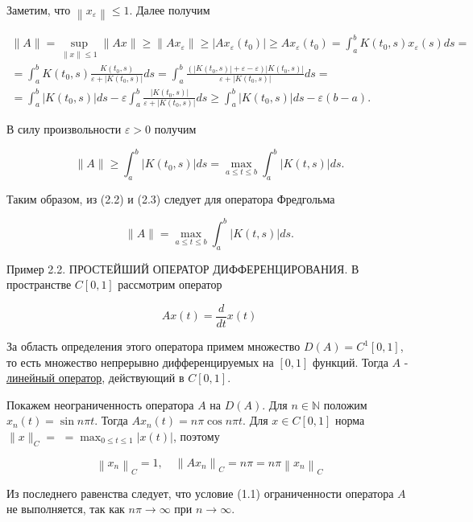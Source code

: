 \documentclass[a4paper, 12pt]{extarticle}
\begin{document}
Заметим, что $\left\|x_{\varepsilon}\right\| \leq 1$. Далее получим

$$
	\begin{gathered}
		\|A\|=\sup _{\|x\| \leq 1}\|A x\| \geq\left\|A x_{\varepsilon}\right\| \geq\left|A x_{\varepsilon}\left(t_{0}\right)\right| \geq A x_{\varepsilon}\left(t_{0}\right)=\int_{a}^{b} K\left(t_{0}, s\right) x_{\varepsilon}(s) d s= \\
		=\int_{a}^{b} K\left(t_{0}, s\right) \frac{K\left(t_{0}, s\right)}{\varepsilon+\left|K\left(t_{0}, s\right)\right|} d s=\int_{a}^{b} \frac{\left(\left|K\left(t_{0}, s\right)\right|+\varepsilon-\varepsilon\right)\left|K\left(t_{0}, s\right)\right|}{\varepsilon+\left|K\left(t_{0}, s\right)\right|} d s= \\
		=\int_{a}^{b}\left|K\left(t_{0}, s\right)\right| d s-\varepsilon \int_{a}^{b} \frac{\left|K\left(t_{0}, s\right)\right|}{\varepsilon+\left|K\left(t_{0}, s\right)\right|} d s \geq \int_{a}^{b}\left|K\left(t_{0}, s\right)\right| d s-\varepsilon(b-a) .
	\end{gathered}
$$

В силу произвольности $\varepsilon>0$ получим

$$
	\|A\| \geq \int_{a}^{b}\left|K\left(t_{0}, s\right)\right| d s=\max _{a \leq t \leq b} \int_{a}^{b}|K(t, s)| d s .
$$

Таким образом, из (2.2) и (2.3) следует для оператора Фредгольма

$$
	\|A\|=\max _{a \leq t \leq b} \int_{a}^{b}|K(t, s)| d s .
$$

Пример 2.2. ПРОСТЕЙШИЙ ОПЕРАТОР ДИФФЕРЕНЦИРОВАНИЯ. В пространстве $C[0,1]$ рассмотрим оператор

$$
	A x(t)=\frac{d}{d t} x(t)
$$

За область определения этого оператора примем множество $D(A)=C^{1}[0,1]$, то есть множество непрерывно дифференцируемых на $[0,1]$ функций. Тогда $A$ - \hyperlink{linOperator}{линейный оператор}, действующий в $C[0,1]$.

Покажем неограниченность оператора $A$ на $D(A)$. Для $n \in \mathbb{N}$ положим $x_{n}(t)=\sin n \pi t$. Тогда $A x_{n}(t)=n \pi \cos n \pi t$. Для $x \in C[0,1]$ норма $\|x\|_{C}=$ $=\max _{0 \leq t \leq 1}|x(t)|$, поэтому

$$
	\left\|x_{n}\right\|_{C}=1, \quad\left\|A x_{n}\right\|_{C}=n \pi=n \pi\left\|x_{n}\right\|_{C}
$$

Из последнего равенства следует, что условие (1.1) ограниченности оператора $A$ не выполняется, так как $n \pi \rightarrow \infty$ при $n \rightarrow \infty$.
\end{document}
